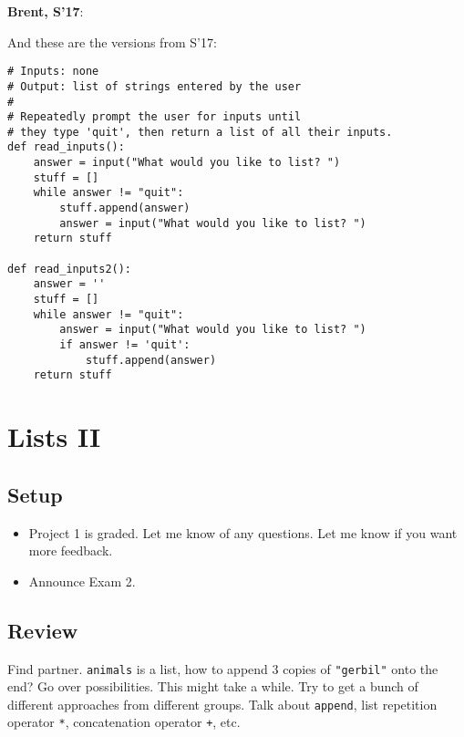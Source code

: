 \documentclass{article}
\newenvironment{reflect}[1]
{
  \noindent
  \begin{lrbox}{\reflectbox}
    \begin{minipage}[t]{\textwidth}
      \textbf{#1}:
}{
    \end{minipage}
  \end{lrbox}
  \fbox{\usebox{\reflectbox}}
}
\begin{document}
\begin{reflect}{Brent, S'17}
  And these are the versions from S'17:
\end{reflect}
\begin{verbatim}
# Inputs: none
# Output: list of strings entered by the user
#
# Repeatedly prompt the user for inputs until
# they type 'quit', then return a list of all their inputs.
def read_inputs():
    answer = input("What would you like to list? ")
    stuff = []
    while answer != "quit":
        stuff.append(answer)
        answer = input("What would you like to list? ")
    return stuff

def read_inputs2():
    answer = ''
    stuff = []
    while answer != "quit":
        answer = input("What would you like to list? ")
        if answer != 'quit':
            stuff.append(answer)
    return stuff
\end{verbatim}

\newpage
\section{Lists II}

\subsection*{Setup}
\begin{itemize}
\item Project 1 is graded.  Let me know of any questions.  Let me know
  if you want more feedback.
\item Announce Exam 2.
\end{itemize}

\subsection*{Review}
Find partner. \verb|animals| is a list, how to append 3 copies of
\verb|"gerbil"| onto the end?  Go over possibilities.  This might take
a while.  Try to get a bunch of different approaches from different
groups.  Talk about \verb|append|, list repetition operator \verb|*|,
concatenation operator \verb|+|, etc.
\end{document}
